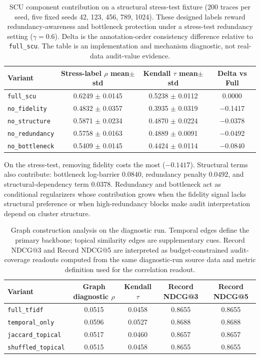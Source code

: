 \documentclass[a4paper,fleqn]{cas-sc}
\begin{document}
\begin{table}[ht]
\caption{SCU component contribution on a structural stress-test fixture (200 traces per seed, five fixed seeds 42, 123, 456, 789, 1024). These designed labels reward redundancy-awareness and bottleneck protection under a stress-test redundancy setting ($\gamma=0.6$). Delta is the annotation-order consistency difference relative to \texttt{full\_scu}. The table is an implementation and mechanism diagnostic, not real-data audit-value evidence.}
\label{tab:scu-stress-test}
\centering
\small
\renewcommand{\arraystretch}{1.08}
\begin{tabular}{lccc}
\toprule
\textbf{Variant} & \textbf{Stress-label $\rho$ mean$\pm$std} & \textbf{Kendall $\tau$ mean$\pm$std} & \textbf{Delta vs Full} \\
\midrule
\texttt{full\_scu} & 0.6249 $\pm$ 0.0145 & 0.5238 $\pm$ 0.0112 & 0.0000 \\
\texttt{no\_fidelity} & 0.4832 $\pm$ 0.0357 & 0.3935 $\pm$ 0.0319 & $-$0.1417 \\
\texttt{no\_structure} & 0.5871 $\pm$ 0.0234 & 0.4870 $\pm$ 0.0224 & $-$0.0378 \\
\texttt{no\_redundancy} & 0.5758 $\pm$ 0.0163 & 0.4889 $\pm$ 0.0091 & $-$0.0492 \\
\texttt{no\_bottleneck} & 0.5409 $\pm$ 0.0145 & 0.4424 $\pm$ 0.0114 & $-$0.0840 \\
\bottomrule
\end{tabular}
\end{table}

On the stress-test, removing fidelity costs the most ($-0.1417$). Structural terms also contribute: bottleneck log-barrier $0.0840$, redundancy penalty $0.0492$, and structural-dependency term $0.0378$. Redundancy and bottleneck act as conditional regularizers whose contribution grows when the fidelity signal lacks structural preference or when high-redundancy blocks make audit interpretation depend on cluster structure.

\begin{table}[ht]
\caption{Graph construction analysis on the diagnostic run. Temporal edges define the primary backbone; topical similarity edges are supplementary cues. Record NDCG@3 and Record NDCG@5 are interpreted as budget-constrained audit-coverage readouts computed from the same diagnostic-run source data and metric definition used for the correlation readout.}
\label{tab:graph-construction-analysis}
\centering
\small
\renewcommand{\arraystretch}{1.08}
\begin{tabular}{lcccc}
\toprule
\textbf{Variant} & \textbf{Graph diagnostic $\rho$} & \textbf{Kendall $\tau$} & \textbf{Record NDCG@3} & \textbf{Record NDCG@5} \\
\midrule
\texttt{full\_tfidf} & 0.0515 & 0.0458 & 0.8655 & 0.8655 \\
\texttt{temporal\_only} & 0.0596 & 0.0527 & 0.8688 & 0.8688 \\
\texttt{jaccard\_topical} & 0.0517 & 0.0460 & 0.8657 & 0.8657 \\
\texttt{shuffled\_topical} & 0.0515 & 0.0458 & 0.8655 & 0.8655 \\
\bottomrule
\end{tabular}
\end{table}
\end{document}
